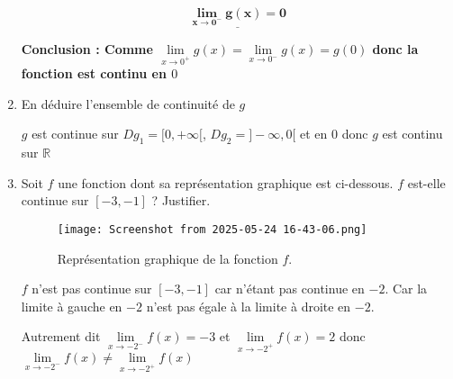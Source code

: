 \documentclass[12pt,a4paper]{article}
\begin{document}
\begin{enumerate}
											\begin{resultbox}
                        \[
                            \mathbf{ \underline{\lim\limits_{x \to 0^{-}}g(x) = 0} }
                        \]
                    \end{resultbox}     
    \textbf{Conclusion : Comme $ \lim\limits_{x \to 0^{+}}g(x) = \lim\limits_{x \to 0^{-}}g(x) = g(0) $ donc la fonction est continu en $0$}  
    \item En déduire l'ensemble de continuité de \( g \)

\( g \) est continue sur  $Dg_{1} = [0,+\infty[$,  $Dg_{2} = ]-\infty, 0[$  et en $0$ donc $g$ est continu sur $\mathbb{R}$ 
    
    \item Soit \( f \) une fonction dont sa représentation graphique est ci-dessous. \( f \) est-elle continue sur \( [-3, -1] \) ? Justifier.
          \begin{center}
              \begin{figure}[H]
                  \centering \texttt{[image: Screenshot from 2025-05-24 16-43-06.png]}
                  \caption{Représentation graphique de la fonction \( f \).}
                  \label{fig:fonction_f}
              \end{figure}
          \end{center}
          
$f$ n'est pas continue sur \( [-3, -1] \) car  n'étant pas continue en $-2$. Car la limite à gauche en $-2$ n'est pas égale à la limite à droite en $-2$.

Autrement dit $\lim\limits_{x\to -2^{-}}f(x)=-3$ et $\lim\limits_{x\to -2^{+}}f(x)=2$ donc $\lim\limits_{x\to -2^{-}}f(x)\neq\lim\limits_{x\to -2^{+}}f(x)$
\end{enumerate}
\end{document}
